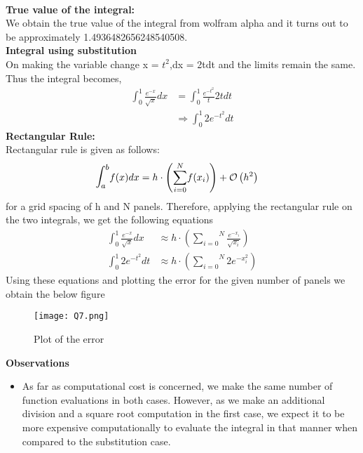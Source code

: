 \documentclass[letterpaper]{exam}
\begin{document}
\begin{questions}
\begin{solution}
\\
\textbf{True value of the integral:}\\
We obtain the true value of the integral from wolfram alpha and it turns out to be approximately 1.4936482656248540508.\\
\textbf{Integral using substitution}\\
On making the variable change x = $t^2$,dx = 2tdt and the limits remain the same.\\
Thus the integral becomes,
\begin{align*}
    \int_{0}^{1} \frac{e^{-x}}{\sqrt{x}} dx &= \int_{0}^{1} \frac{e^{-t^2}}{t} 2t dt \\
    &\Rightarrow
    \int_{0}^{1} 2e^{-t^2} dt
\end{align*}
\textbf{Rectangular Rule:}\\
Rectangular rule is given as follows:
\begin{align}
    \mathlarger{\mathlarger{\int}}_a^b f(x) dx &= h \cdot \left(\overset{N}{\underset{i=0}{\sum}} f(x_i)\right) + \mathcal{O}\left(h^2\right)
 \end{align}
 for a grid spacing of h and N panels.
 Therefore, applying the rectangular rule on the two integrals, we get the following equations
 \begin{align*}
     \int_{0}^{1} \frac{e^{-x}}{\sqrt{x}} dx &\approx h \cdot \left(\overset{N}{\underset{i=0}{\sum}} \frac{e^{-x_i}}{\sqrt{x_i}}\right)\\
     \int_{0}^{1} 2e^{-t^2} dt &\approx  h \cdot \left(\overset{N}{\underset{i=0}{\sum}} 2e^{-x_i^2} \right)
 \end{align*}
 Using these equations and plotting the error for the given number of panels we obtain the below figure
 \begin{figure}[H]  
     \centering
    \texttt{[image: Q7.png]}
     \label{fig:Dendrogram for the problem 3(c)}
     \caption{Plot of the error}
\end{figure}
\textbf{Observations}
\begin{itemize}
    \item As far as computational cost is concerned, we make the same number of function evaluations in both cases. However, as we make an additional division and a square root computation in the first case, we expect it to be more expensive computationally to evaluate the integral in that manner when compared to the substitution case.

\end{itemize}
\end{solution}
\end{questions}
\end{document}
